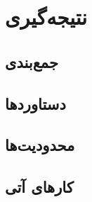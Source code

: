 \chapter{نتیجه‌گیری}
\label{ch:conclusion}

\section{جمع‌بندی}
\section{دستاوردها}
\section{محدودیت‌ها}
\section{کارهای آتی}

